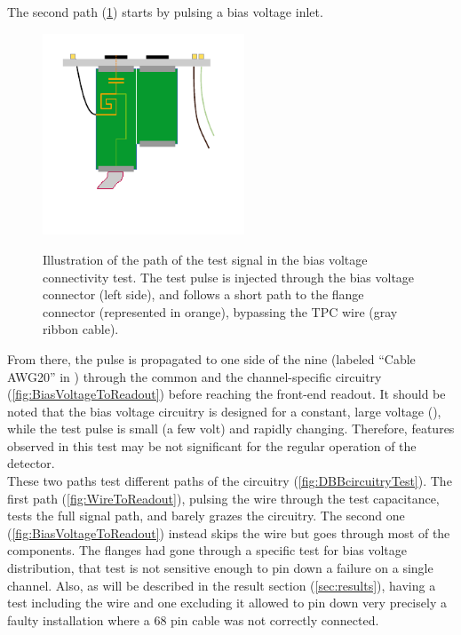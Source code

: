 The second path (\cref{fig:BiasVoltageTestPath}) starts by pulsing a bias
voltage inlet.
\begin{figure}
  {
    \centering
    \includegraphics[height=6cm,clip,trim=0 30 0 0]{fig/BiasVoltagePath}\\
  }
  \caption{\label{fig:BiasVoltageTestPath}
    Illustration of the path of the test signal in the bias voltage connectivity
    test. The test pulse is injected through the bias voltage connector (left side),
    and follows a short path to the flange connector (represented in orange),
    bypassing the TPC wire (gray ribbon cable).
  }
\end{figure}
From there, the pulse is propagated to one side of the nine \DBB (labeled
``Cable AWG20'' in \cite{ICARUSDBB}) through the common and the channel-specific
circuitry (\cref{fig:BiasVoltageToReadout}) before reaching the front-end
readout.
It should be noted that the bias voltage circuitry is designed for a constant,
large voltage (), while the test pulse is small (a few volt) and rapidly
changing.
Therefore, features observed in this test may be not significant for the regular
operation of the detector.
\\
These two paths test different paths of the circuitry
(\cref{fig:DBBcircuitryTest}).
The first path (\cref{fig:WireToReadout}), pulsing the wire through the test
capacitance, tests the full signal path, and barely grazes the \DBB circuitry.
The second one (\cref{fig:BiasVoltageToReadout}) instead skips the wire but goes
through most of the \DBB components.
The flanges had gone through a specific test for bias voltage distribution, that
test is not sensitive enough to pin down a failure on a single channel.
Also, as will be described in the result section (\cref{sec:results}), having a
test including the wire and one excluding it allowed to pin down very precisely
a faulty installation where a 68 pin cable was not correctly connected.
\\
